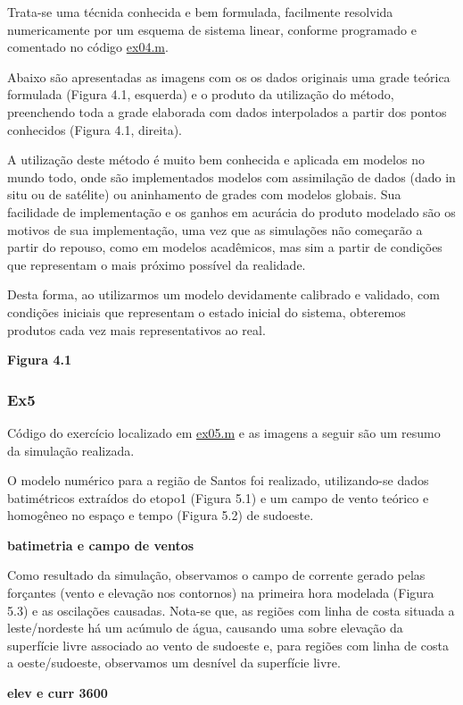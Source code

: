 \documentclass[11pt]{article}
\begin{document}
Trata-se uma técnida conhecida e bem formulada, facilmente resolvida
numericamente por um esquema de sistema linear, conforme programado e
comentado no código \href{../codes/ex04.m}{ex04.m}.

Abaixo são apresentadas as imagens com os os dados originais uma grade
teórica formulada (Figura 4.1, esquerda) e o produto da utilização do
método, preenchendo toda a grade elaborada com dados interpolados a
partir dos pontos conhecidos (Figura 4.1, direita).

A utilização deste método é muito bem conhecida e aplicada em modelos no
mundo todo, onde são implementados modelos com assimilação de dados
(dado in situ ou de satélite) ou aninhamento de grades com modelos
globais. Sua facilidade de implementação e os ganhos em acurácia do
produto modelado são os motivos de sua implementação, uma vez que as
simulações não começarão a partir do repouso, como em modelos
acadêmicos, mas sim a partir de condições que representam o mais próximo
possível da realidade.

Desta forma, ao utilizarmos um modelo devidamente calibrado e validado,
com condições iniciais que representam o estado inicial do sistema,
obteremos produtos cada vez mais representativos ao real.

\textbf{Figura 4.1}

    \subsubsection{Ex5}\label{ex5}

Código do exercício localizado em \href{../codes/ex05.m}{ex05.m} e as
imagens a seguir são um resumo da simulação realizada.

O modelo numérico para a região de Santos foi realizado, utilizando-se
dados batimétricos extraídos do etopo1 (Figura 5.1) e um campo de vento
teórico e homogêneo no espaço e tempo (Figura 5.2) de sudoeste.

\textbf{batimetria e campo de ventos}

Como resultado da simulação, observamos o campo de corrente gerado pelas
forçantes (vento e elevação nos contornos) na primeira hora modelada
(Figura 5.3) e as oscilações causadas. Nota-se que, as regiões com linha
de costa situada a leste/nordeste há um acúmulo de água, causando uma
sobre elevação da superfície livre associado ao vento de sudoeste e,
para regiões com linha de costa a oeste/sudoeste, observamos um desnível
da superfície livre.

\textbf{elev e curr 3600}
\end{document}
